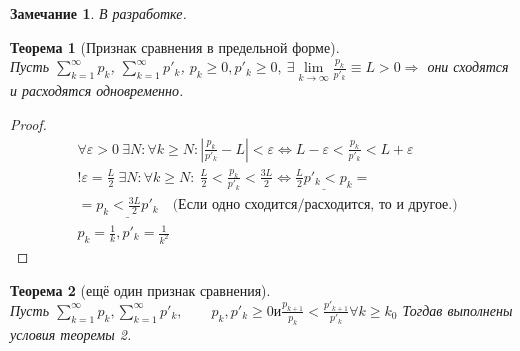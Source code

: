 \documentclass[12pt, oneside]{article}
\theoremstyle{plain}
\newtheorem{Theorem}{Теорема}
\newtheorem{Note}{Замечание}
\newcommand{\llim}{\lim\limits}
\newcommand{\lsum}{\sum\limits}
\begin{document}
	\begin{Note}
		В разработке.
	\end{Note}

	\begin{Theorem}[Признак сравнения в предельной форме] \ \\
		Пусть \(\lsum_{k=1}^{\infty} p_k\), \(\lsum_{k=1}^{\infty} p'_k\), \(p_k 
		\geq 0, p'_k \geq 0,\ \exists \llim_{k\to\infty} \frac{p_k}{p'_k} 
		\equiv L > 0 \Rightarrow \) они сходятся и расходятся одновременно.
	\end{Theorem}
	\begin{proof}
		\begin{equation} \nonumber
		\begin{split}
				& \forall \varepsilon > 0 \ \exists N: \forall k \geq N: 
				\left|\frac{p_k}{p'_k} - L \right| < \varepsilon \Leftrightarrow L -
				\varepsilon < \frac{p_k}{p'_k} < L + \varepsilon \\
				& ! \varepsilon = \frac{L}{2} \ \exists N: \forall k \geq N: \
				\frac{L}{2} < \frac{p_k}{p'_k} < \frac{3L}{2} \Leftrightarrow 
				\underline{\frac{L}{2}p'_k < p_k} = \\
				& = \underline{p_k < \frac{3L}{2} p'_k} \quad 
				\text{(Если одно сходится/расходится, то и другое.)} \\
				& p_k = \frac{1}{k}, p'_k = \frac{1}{k^2}
		\end{split}	
		\end{equation}
	\end{proof}

	\begin{Theorem}[ещё один признак сравнения] \ \\ 
		Пусть \(\lsum_{k=1}^{\infty}p_k, \lsum_{k=1}^{\infty}p'_k, \qquad
		p_k, p'_k \geq 0 \text{и} \frac{p_{k+1}}{p_k} < \frac{p'_{k+1}}{p'_k} 
		\forall k \geq k_0\) Тогдав выполнены условия теоремы 2.
	\end{Theorem}
\end{document}
